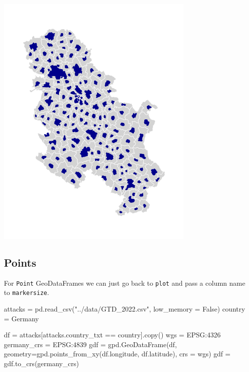 \documentclass[
  letterpaper,
  DIV=11,
  numbers=noendperiod]{scrreprt}
\newenvironment{Shaded}{\begin{snugshade}}{\end{snugshade}}
\newcommand{\NormalTok}[1]{\textcolor[rgb]{0.00,0.23,0.31}{#1}}
\newcommand{\OperatorTok}[1]{\textcolor[rgb]{0.37,0.37,0.37}{#1}}
\newcommand{\StringTok}[1]{\textcolor[rgb]{0.13,0.47,0.30}{#1}}
\newcommand{\VariableTok}[1]{\textcolor[rgb]{0.07,0.07,0.07}{#1}}
\begin{document}
\includegraphics{labs/w02_maps_files/figure-pdf/cell-49-output-1.png}

\subsection{Points}\label{points}

For \texttt{Point} GeoDataFrames we can just go back to \texttt{plot}
and pass a column name to \texttt{markersize}.

\begin{Shaded}
\begin{Highlighting}[]
\NormalTok{attacks }\OperatorTok{=}\NormalTok{ pd.read\_csv(}\StringTok{"../data/GTD\_2022.csv"}\NormalTok{, low\_memory }\OperatorTok{=} \VariableTok{False}\NormalTok{)}
\NormalTok{country }\OperatorTok{=} \StringTok{\textquotesingle{}Germany\textquotesingle{}}

\NormalTok{df }\OperatorTok{=}\NormalTok{ attacks[attacks.country\_txt }\OperatorTok{==}\NormalTok{ country].copy()}
\NormalTok{wgs }\OperatorTok{=} \StringTok{\textquotesingle{}EPSG:4326\textquotesingle{}}
\NormalTok{germany\_crs }\OperatorTok{=} \StringTok{\textquotesingle{}EPSG:4839\textquotesingle{}}
\NormalTok{gdf }\OperatorTok{=}\NormalTok{ gpd.GeoDataFrame(df, geometry}\OperatorTok{=}\NormalTok{gpd.points\_from\_xy(df.longitude, df.latitude), crs }\OperatorTok{=}\NormalTok{ wgs)}
\NormalTok{gdf }\OperatorTok{=}\NormalTok{ gdf.to\_crs(germany\_crs)}
\end{Highlighting}
\end{Shaded}
\end{document}
